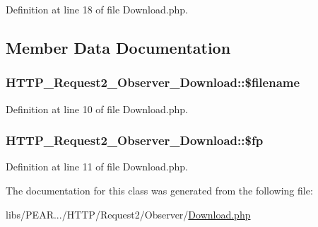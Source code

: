 Definition at line 18 of file Download.\+php.



\subsection{Member Data Documentation}
\subsubsection[{\texorpdfstring{\$filename}{$filename}}]{\setlength{\rightskip}{0pt plus 5cm}H\+T\+T\+P\+\_\+\+Request2\+\_\+\+Observer\+\_\+\+Download\+::\$filename\hspace{0.3cm}{\ttfamily [protected]}}\hypertarget{classHTTP__Request2__Observer__Download_a8d465a7b54376270b909228207640680}{}\label{classHTTP__Request2__Observer__Download_a8d465a7b54376270b909228207640680}


Definition at line 10 of file Download.\+php.

\subsubsection[{\texorpdfstring{\$fp}{$fp}}]{\setlength{\rightskip}{0pt plus 5cm}H\+T\+T\+P\+\_\+\+Request2\+\_\+\+Observer\+\_\+\+Download\+::\$fp\hspace{0.3cm}{\ttfamily [protected]}}\hypertarget{classHTTP__Request2__Observer__Download_a25e23c48a242ef021c465dde71719183}{}\label{classHTTP__Request2__Observer__Download_a25e23c48a242ef021c465dde71719183}


Definition at line 11 of file Download.\+php.



The documentation for this class was generated from the following file\+:\begin{DoxyCompactItemize}
\item 
libs/\+P\+E\+A\+R.../\+H\+T\+T\+P/\+Request2/\+Observer/\hyperlink{Download_8php}{Download.\+php}\end{DoxyCompactItemize}
